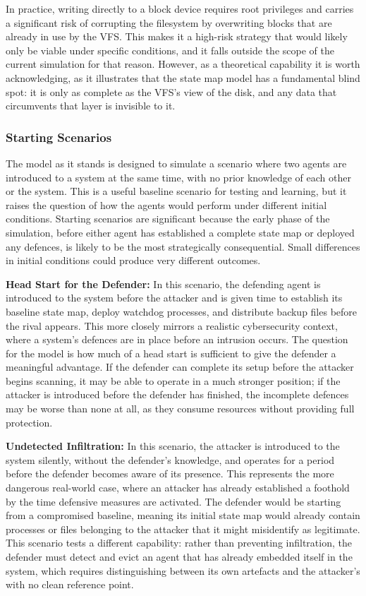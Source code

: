 In practice, writing directly to a block device requires root privileges and carries a significant risk of corrupting the filesystem by overwriting blocks that are already in use by the VFS. This makes it a high-risk strategy that would likely only be viable under specific conditions, and it falls outside the scope of the current simulation for that reason. However, as a theoretical capability it is worth acknowledging, as it illustrates that the state map model has a fundamental blind spot: it is only as complete as the VFS's view of the disk, and any data that circumvents that layer is invisible to it.

\subsubsection{Starting Scenarios}
\label{StartingScenarios}

The model as it stands is designed to simulate a scenario where two agents are introduced to a system at the same time, with no prior knowledge of each other or the system. This is a useful baseline scenario for testing and learning, but it raises the question of how the agents would perform under different initial conditions. Starting scenarios are significant because the early phase of the simulation, before either agent has established a complete state map or deployed any defences, is likely to be the most strategically consequential. Small differences in initial conditions could produce very different outcomes.

\textbf{Head Start for the Defender:} In this scenario, the defending agent is introduced to the system before the attacker and is given time to establish its baseline state map, deploy watchdog processes, and distribute backup files before the rival appears. This more closely mirrors a realistic cybersecurity context, where a system's defences are in place before an intrusion occurs. The question for the model is how much of a head start is sufficient to give the defender a meaningful advantage. If the defender can complete its setup before the attacker begins scanning, it may be able to operate in a much stronger position; if the attacker is introduced before the defender has finished, the incomplete defences may be worse than none at all, as they consume resources without providing full protection.

\textbf{Undetected Infiltration:} In this scenario, the attacker is introduced to the system silently, without the defender's knowledge, and operates for a period before the defender becomes aware of its presence. This represents the more dangerous real-world case, where an attacker has already established a foothold by the time defensive measures are activated. The defender would be starting from a compromised baseline, meaning its initial state map would already contain processes or files belonging to the attacker that it might misidentify as legitimate. This scenario tests a different capability: rather than preventing infiltration, the defender must detect and evict an agent that has already embedded itself in the system, which requires distinguishing between its own artefacts and the attacker's with no clean reference point.

